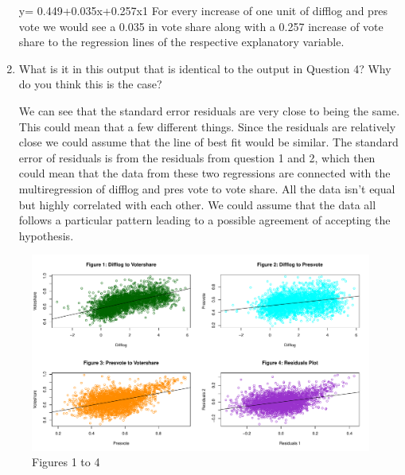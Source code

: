 \documentclass[12pt,letterpaper]{article}
\begin{document}
\begin{enumerate}
		y= 0.449+0.035x+0.257x1
		For every increase of one unit of difflog and pres vote we would see a 0.035 in vote share along with a 0.257 increase of vote share to the regression lines of the respective explanatory variable.
		
		\item What is it in this output that is identical to the output in Question 4? Why do you think this is the case? \vspace{7cm}
		
		We can see that the standard error residuals are very close to being the same. This could mean that a few different things. Since the residuals are relatively close we could assume that the line of best fit would be similar. The standard error of residuals is from the residuals from question 1 and 2, which then could mean that the data from these two regressions are connected with the multiregression of difflog and pres vote to vote share.
		All the data isn’t equal but highly correlated with each other. We could assume that the data all follows a particular pattern leading to a possible agreement of accepting the hypothesis. 
		
		
		
	\end{enumerate}

\vspace{7cm}






\vspace{.5cm}
	\begin{figure}
	\caption{\footnotesize Figures 1 to 4}
	\label{`Figures'}
	\includegraphics[width=.85\textwidth]{PS03_plots1to4.pdf}
	\centering
\end{figure}
\end{document}
